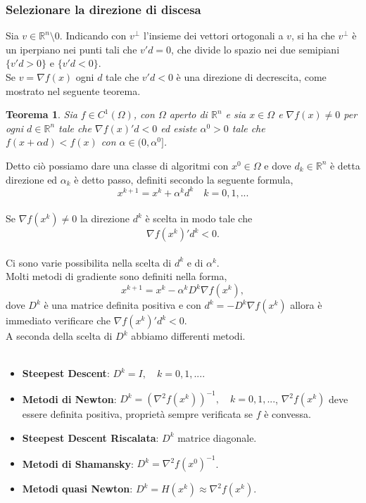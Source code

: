 \documentclass[a4paper, 12pt]{article}
\newtheorem{theorem}{Teorema}
\begin{document}
\subsubsection{Selezionare la direzione di discesa}
Sia $v \in \mathbb{R}^n \setminus 0$. Indicando con $v^\perp$ l'insieme dei vettori ortogonali a $v$, si ha che $v^\perp$ è un iperpiano nei punti tali che $v'd = 0$, che divide lo spazio nei due semipiani $\{v'd > 0\}$ e $\{v'd < 0\}$.\\
Se $v = \nabla f(x)$ ogni $d$ tale che $v'd < 0$ è una direzione di decrescita, come mostrato nel seguente teorema.
\begin{theorem}
Sia $f \in C^1(\Omega)$, con $\Omega$ aperto di $\mathbb{R}^n$ e sia $x \in \Omega$ e $\nabla f(x) \neq 0$ per ogni $d \in \mathbb{R}^n$ tale che $\nabla f(x)'d < 0$ ed esiste $\alpha^0 > 0$ tale che $f(x + \alpha d) < f(x)$ con $\alpha \in (0, \alpha^0]$.
\end{theorem}
Detto ciò possiamo dare una classe di algoritmi con $x^0 \in \Omega$ e dove $d_k \in \mathbb{R}^n$ è detta direzione ed $\alpha_k$ è detto passo, definiti secondo la seguente formula,\\
\[x^{k+1} = x^k + \alpha^k d^k \quad k=0, 1, ...\]\\
Se $\nabla f(x^k) \neq 0$ la direzione $d^k$ è scelta in modo tale che\\
\[\nabla f(x^k)'d^k < 0.\]\\
Ci sono varie possibilita nella scelta di $d^k$ e di $\alpha^k$.\\
Molti metodi di gradiente sono definiti nella forma,
\[x^{k+1} = x^k - \alpha^k D^k \nabla f(x^k),\]
dove $D^k$ è una matrice definita positiva e con $d^k = -D^k\nabla f(x^k)$ allora è immediato verificare che $\nabla f(x^k)'d^k < 0$.\\
A seconda della scelta di $D^k$ abbiamo differenti metodi.\\\\
\begin{itemize}
    \item \textbf{Steepest Descent}: $D^k = I, \quad k = 0, 1, ...$.
    \item \textbf{Metodi di Newton}: $D^k = (\nabla^2 f(x^k))^{-1}, \quad k = 0, 1, ...$, $\nabla^2 f(x^k)$ deve essere definita positiva, proprietà sempre verificata se $f$ è convessa.
    \item \textbf{Steepest Descent Riscalata}: $D^k$ matrice diagonale.
    \item \textbf{Metodi di Shamansky}: $D^k = \nabla^2 f(x^0)^{-1}$.
    \item \textbf{Metodi quasi Newton}: $D^k = H(x^k) \approx \nabla^2 f(x^k)$.
\end{itemize}
\end{document}
